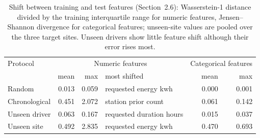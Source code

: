 \begin{table}[H]\centering\footnotesize
\caption{Shift between training and test features (Section~2.6): Wasserstein-1 distance divided by the training interquartile range for numeric features, Jensen--Shannon divergence for categorical features; unseen-site values are pooled over the three target sites. Unseen drivers show little feature shift although their error rises most.}\label{tab:s-shift}
\begin{tabular}{lrrlrr}\toprule
Protocol & \multicolumn{3}{c}{Numeric features} & \multicolumn{2}{c}{Categorical features} \\ & mean & max & most shifted & mean & max \\\midrule
Random & 0.013 & 0.059 & requested energy kwh & 0.000 & 0.001 \\
Chronological & 0.451 & 2.072 & station prior count & 0.061 & 0.142 \\
Unseen driver & 0.063 & 0.167 & requested duration hours & 0.015 & 0.037 \\
Unseen site & 0.492 & 2.835 & requested energy kwh & 0.470 & 0.693 \\
\bottomrule\end{tabular}\end{table}

